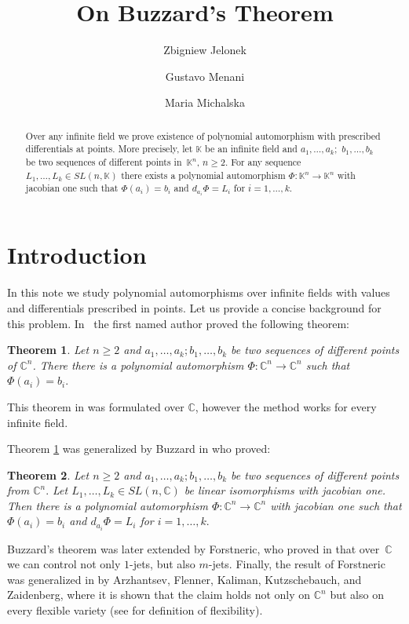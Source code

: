 \documentclass{amsart}
\author[Z. Jelonek]{Zbigniew Jelonek}
\author[G. Menani]{Gustavo Menani}
\author[M. Michalska]{Maria Michalska}
\title[On Buzzard's Theorem]{On Buzzard's Theorem}
\newtheorem{theorem}{Theorem}[section]
\newcommand{\C}{\mathbb{C}}
\newcommand{\K}{\mathbb{K}}
\begin{document}
	
\maketitle



\begin{abstract}
	Over any infinite field we prove existence of polynomial automorphism with prescribed differentials at points. More precisely, let $\K$ be an infinite field and $a_1,\ldots, a_k;$ $b_1,\ldots , b_k$ be two sequences of different points in~$\K^n$, $n\ge 2$. For any sequence $L_1,\ldots, L_k\in SL(n,\K)$ there exists a polynomial automorphism $\Phi: \K^n\to \K^n$  with 
	jacobian one such that $\Phi(a_i)=b_i$ and $d_{a_i} \Phi= L_i$ for $i=1,\ldots, k.$
\end{abstract}


\section{Introduction}
In this note we study polynomial automorphisms over infinite fields with values and differentials prescribed in points. 
Let us provide a concise background for this problem.  In~\cite{jel} the first named author proved the following theorem:

\begin{theorem}\label{jelonek}
Let $n\ge 2$ and $a_1,\ldots, a_k; b_1,\ldots , b_k$ be two sequences of different points of $\C^n$.
There there is a polynomial automorphism $\Phi: \C^n\to \C^n$ such that $\Phi(a_i)=b_i.$
\end{theorem}

\begin{remark}
{\rm This theorem in \cite{jel} was formulated over $\C$, however the method works for every infinite field.}
\end{remark}

Theorem 
\ref{jelonek} was generalized  by Buzzard in \cite{buz} who proved:

\begin{theorem}\label{buzzard}
Let  $n\ge 2$ and $a_1,\ldots, a_k; b_1,\ldots , b_k$ be two sequences of different points from $\C^n.$ Let $L_1,\ldots, L_k\in SL(n,\C)$ be linear isomorphisms with 
jacobian one. 
Then there is a polynomial automorphism $\Phi: \C^n\to \C^n$ with jacobian one such that $\Phi(a_i)=b_i$ and $d_{a_i} \Phi= L_i$ for $i=1,\ldots, k.$
\end{theorem}

Buzzard's theorem was later extended by Forstneric,  who proved in \cite{for} that over~$\C$ we can control not only $1$-jets, but also $m$-jets. Finally, the 
result of Forstneric was generalized in \cite{kal} by Arzhantsev,   Flenner,  Kaliman,  Kutzschebauch, and Zaidenberg, where it is shown that the claim holds not only on 
$\C^n$ but also on every flexible variety (see \cite{kal} for definition of flexibility).
\end{document}
